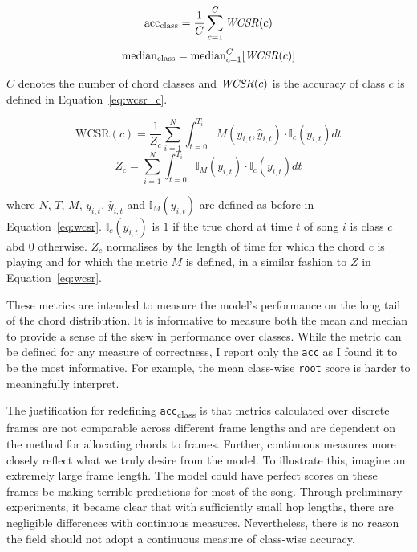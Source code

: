 \begin{equation}\label{eq:mean_class_wise}
    \text{acc}\textsubscript{class} = \frac{1}{C} \sum_{c=1}^{C} \text{\emph{WCSR}}(c)
\end{equation}
\begin{equation}\label{eq:median_class_wise}
    \text{median}\textsubscript{class} = \text{median}_{c=1}^{C} [\text{\emph{WCSR}}(c)]
\end{equation}

$C$ denotes the number of chord classes and $\text{\emph{WCSR}}(c)$ is the accuracy of class $c$ is defined in Equation~\ref{eq:wcsr_c}.

\begin{equation}\label{eq:wcsr_c}
    \text{WCSR}(c) = \frac{1}{Z_c}\sum_{i=1}^{N} \int_{t=0}^{T_i} M(y_{i,t},\hat{y}_{i,t}) \cdot \mathbb{I}_c(y_{i,t}) dt
\end{equation}
\begin{equation}
    Z_c = \sum_{i=1}^{N} \int_{t=0}^{T_i} \mathbb{I}_M(y_{i,t})\cdot \mathbb{I}_c(y_{i,t}) dt
\end{equation}

where $N$, $T$, $M$, $y_{i,t}$, $\hat{y}_{i,t}$ and $\mathbb{I}_M(y_{i,t})$ are defined as before in Equation~\ref{eq:wcsr}. $\mathbb{I}_c(y_{i,t})$ is $1$ if the true chord at time $t$ of song $i$ is class $c$ abd $0$ otherwise. $Z_c$ normalises by the length of time for which the chord $c$ is playing and for which the metric $M$ is defined, in a similar fashion to $Z$ in Equation~\ref{eq:wcsr}.

These metrics are intended to measure the model's performance on the long tail of the chord distribution. It is informative to measure both the mean and median to provide a sense of the skew in performance over classes. While the metric can be defined for any measure of correctness, I report only the \texttt{acc} as I found it to be the most informative. For example, the mean class-wise \texttt{root} score is harder to meaningfully interpret.

The justification for redefining \texttt{acc}\textsubscript{class} is that metrics calculated over discrete frames are not comparable across different frame lengths and are dependent on the method for allocating chords to frames. Further, continuous measures more closely reflect what we truly desire from the model. To illustrate this, imagine an extremely large frame length. The model could have perfect scores on these frames be making terrible predictions for most of the song. Through preliminary experiments, it became clear that with sufficiently small hop lengths, there are negligible differences with continuous measures. Nevertheless, there is no reason the field should not adopt a continuous measure of class-wise accuracy.

